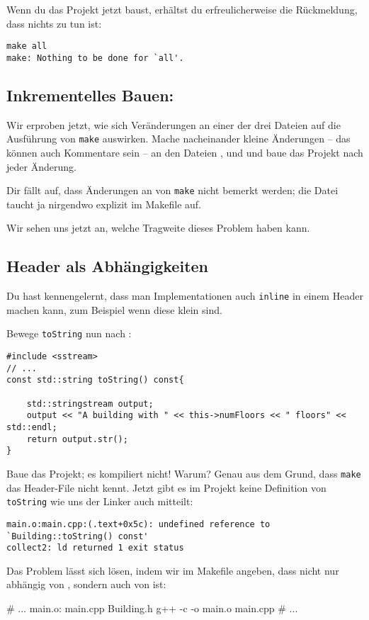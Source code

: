 Wenn du das Projekt jetzt baust, erhältst du erfreulicherweise die Rückmeldung, dass nichts zu tun ist:
\begin{verbatim}
make all
make: Nothing to be done for `all'.
\end{verbatim}

\subsection{Inkrementelles Bauen:}
Wir erproben jetzt, wie sich Veränderungen an einer der drei Dateien auf die Ausführung von \texttt{make} auswirken.
Mache nacheinander kleine Änderungen -- das können auch Kommentare sein -- an den Dateien ,  und  und baue das Projekt nach jeder Änderung.

Dir fällt auf, dass Änderungen an  von \texttt{make} nicht bemerkt werden; die Datei taucht ja nirgendwo explizit im Makefile auf.

Wir sehen uns jetzt an, welche Tragweite dieses Problem haben kann.

\subsection{Header als Abhängigkeiten}
Du hast kennengelernt, dass man Implementationen auch \texttt{inline} in einem Header machen kann, zum Beispiel wenn diese klein sind.

Bewege \lstinline{toString} nun nach :
\begin{lstlisting}
#include <sstream>
// ...
const std::string toString() const{

    std::stringstream output;
    output << "A building with " << this->numFloors << " floors" << std::endl;
    return output.str();
}
\end{lstlisting}

Baue das Projekt; es kompiliert nicht! Warum? Genau aus dem Grund, dass \texttt{make} das Header-File nicht \glqq kennt\grqq{}.
Jetzt gibt es im Projekt keine Definition von \lstinline{toString} wie uns der Linker auch mitteilt:
\begin{verbatim}
main.o:main.cpp:(.text+0x5c): undefined reference to `Building::toString() const'
collect2: ld returned 1 exit status
\end{verbatim}

Das Problem lässt sich lösen, indem wir im Makefile angeben, dass  nicht nur abhängig von , sondern auch von  ist:
\begin{lstmake}
# ...
main.o: main.cpp Building.h
    g++ -c -o main.o main.cpp
# ...
\end{lstmake}

